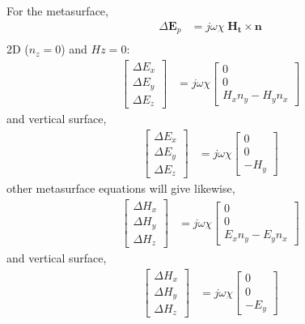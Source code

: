 \documentclass{article}
\newcommand{\E}{\mathbf{E}}
\newcommand{\n}{\mathbf{n}}
\newcommand{\Ht}{\mathbf{H_t}}
\newcommand{\dE}{\Delta E}
\newcommand{\dH}{\Delta H}
\newcommand{\0}{\varnothing}
\begin{document}
\newpage
For the metasurface,
\begin{align*}
    \Delta \E_p &= j \omega \chi\; \Ht \times \n\\
\end{align*}
2D ($n_z = 0$) and $Hz = 0$:
\begin{align*}
    \left[
    \begin{array}{c}
     \dE_x\\
     \dE_y\\
     \dE_z 
     \end{array} \right]
  &= j \omega \chi \left[
    \begin{array}{c}
     0\\
     0\\
    H_x n_y - H_y n_x
    \end{array} \right]
\end{align*}
and vertical surface,
\begin{align*}
    \left[
    \begin{array}{c}
     \dE_x\\
     \dE_y\\
     \dE_z
     \end{array} \right]
  &= j \omega \chi \left[
    \begin{array}{c}
     0\\
     0\\
    - H_y
    \end{array} \right]
\end{align*}
other metasurface equations will give likewise,
\begin{align*}
    \left[
    \begin{array}{c}
     \dH_x\\
     \dH_y\\
     \dH_z
     \end{array} \right]
  &= j \omega \chi \left[
    \begin{array}{c}
     0\\
     0\\
    E_x n_y - E_y n_x
    \end{array} \right]
\end{align*}
and vertical surface,
\begin{align*}
    \left[
    \begin{array}{c}
     \dH_x\\
     \dH_y\\
     \dH_z
     \end{array} \right]
  &= j \omega \chi \left[
    \begin{array}{c}
     0\\
     0\\
    - E_y
    \end{array} \right]
\end{align*}
\end{document}
